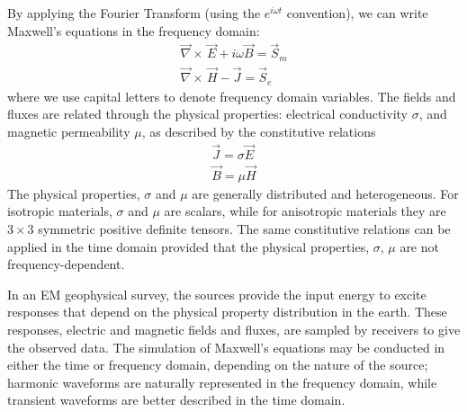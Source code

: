 \documentclass[preprint,review,3p,times,onecolumn,authoryear]{elsarticle}
\newcommand{\curl}{{\vec \nabla}\times\,}
\begin{document}
By applying the Fourier Transform (using the $e^{i\omega t}$ convention), we can write Maxwell's equations in the frequency domain:
\begin{equation}
\begin{split}
\curl \vec{E} + i\omega\vec{B} = \vec{S}_m \\
\curl \vec{H} - \vec{J} = \vec{S}_e
\end{split}
\label{eq:MaxwellBasicFreq}
\end{equation}
where we use capital letters to denote frequency domain variables. The fields and fluxes are  related through the physical properties: electrical conductivity $\sigma$, and magnetic permeability $\mu$, as described by the constitutive relations
\begin{equation}
\begin{split}
\vec{J} = \sigma \vec{E} \\
\vec{B} = \mu \vec{H}
\end{split}
\label{eq:ConstitutiveRelations}
\end{equation}
The physical properties, $\sigma$ and $\mu$ are generally distributed and heterogeneous. For isotropic materials, $\sigma$ and $\mu$ are scalars, while for anisotropic materials they are $3\times3$ symmetric positive definite tensors. The same constitutive relations can be applied in the time domain provided that the physical properties, $\sigma$, $\mu$ are not frequency-dependent.

In an EM geophysical survey, the sources provide the input energy to excite responses that depend on the physical property distribution in the earth. These responses, electric and magnetic fields and fluxes, are sampled by receivers to give the observed data. The simulation of Maxwell's equations may be conducted in either the time or frequency domain, depending on the nature of the source; harmonic waveforms are naturally  represented in the frequency domain, while transient waveforms are better described in the time domain.
\end{document}
